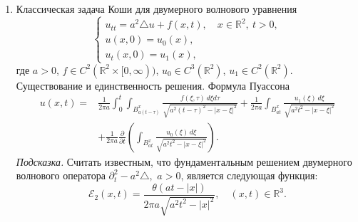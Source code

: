 \documentclass[12pt,a4paper,draft]{article}
\DeclareRobustCommand*{\т}{~--- }
\DeclareRobustCommand*{\ч}{~-- }
\begin{document}
\begin{enumerate}
\item
Классическая задача Коши для двумерного волнового уравнения
$$
    \left\{
        \begin{array}{l}
            u_{tt} = a^2 \triangle u + f (x, t),
            \quad
            x \in {\mathbb R}^2,
            \:
            t > 0,
            \\
            u (x, 0) = u_0 (x),
            \\
            u_t (x, 0) = u_1 (x),
        \end{array}
    \right.
$$
где $a > 0$, $f \in C^2 ({\mathbb R}^2 \times [0, \infty))$, $u_0
\in C^3 ({\mathbb R}^2)$, $u_1 \in C^2 ({\mathbb R}^2)$.
Существование и единственность решения. Формула Пуассона
\begin{align*}
    u (x, t)
    =
    {}
    &
    \frac{
        1
    }{
        2
        \pi
        a
    }
    \int_0^t
    \int_{
        B_{
            a (t - \tau)
        }^x
    }
    \frac{
        f (\xi, \tau)
        \,
        d\xi
        d\tau
    }{
        \sqrt{
            a^2 (t - \tau)^2
            -
            |x - \xi|^2
        }
    }
    +
    \frac{
        1
    }{
        2
        \pi
        a
    }
    \int_{
        B_{
            a t
        }^x
    }
    \frac{
        u_1 (\xi)
        \,
        d\xi
    }{
        \sqrt{
            a^2 t^2
            -
            |x - \xi|^2
        }
    }
    \\
    &
    +
    \frac{
        1
    }{
        2
        \pi
        a
    }
    \frac{\partial}{\partial t}
    \left(
        \int_{
            B_{
                a t
            }^x
        }
        \frac{
            u_0 (\xi)
            \,
            d\xi
        }{
            \sqrt{
                a^2 t^2
                -
                |x - \xi|^2
            }
        }
    \right).
\end{align*}
{\it Подсказка.} Считать известным, что фундаментальным решением
двумерного волнового оператора $
    \partial_t^2 - a^2 \triangle,
$ $a > 0$, является следующая функция:
$$
    {\mathcal E}_2 (x, t)
    =
    \frac{
        \theta (at - |x|)
    }{
        2
        \pi
        a
        \sqrt{
            a^2 t^2 - |x|^2
        }
    },
    \quad
    (x, t)
    \in
    {\mathbb R}^3.
$$


\end{enumerate}
\end{document}
